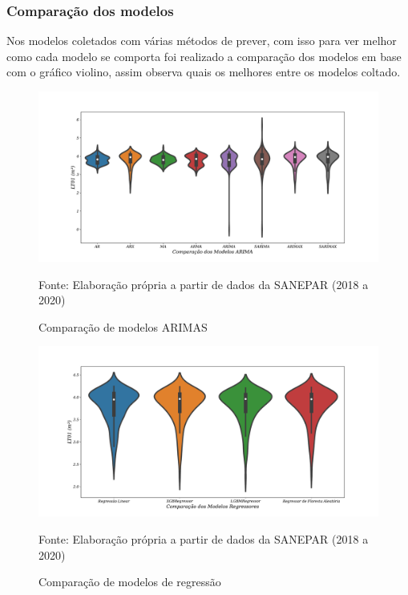  \subsubsection{Compara\c c\~ao dos modelos}
 Nos modelos coletados com várias métodos de prever, com isso para ver melhor como cada modelo se comporta foi realizado a comparação dos modelos em base com o gráfico violino, assim observa quais os melhores entre os modelos coltado.
 
 \begin{figure}[H]
 	\centering
 	\caption{Comparação de modelos ARIMAS}
 	\includegraphics[width=1\linewidth]{Resultados/Figuras/modelos-arima}
 	
 	\label{fig:modelos-arima}
 	
 	Fonte: Elaboração própria a partir de dados da SANEPAR (2018 a 2020)
 \end{figure}
 
 
 \begin{figure}[H]
 	\centering
 	\caption{Comparação de modelos de regressão }
 	\includegraphics[width=1\linewidth]{Resultados/Figuras/violin-LR-XGB-LGBM-RF}
 	
 	\label{fig:violin-lr-xgb-lgbm-rf}
 	
 	Fonte: Elaboração própria a partir de dados da SANEPAR (2018 a 2020)
 \end{figure}


